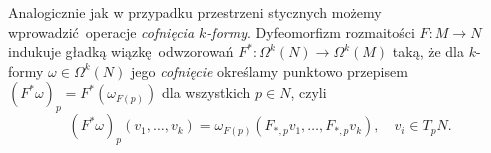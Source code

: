 


Analogicznie jak w przypadku przestrzeni stycznych możemy wprowadzić operacje \emph{cofnięcia \(k\)-formy}. Dyfeomorfizm rozmaitości \(F:M\to N\) indukuje gładką wiązkę odwzorowań \(F^\ast:\Omega^k(N)\to\Omega^{k}(M)\) taką, że dla \(k\)-formy \(\omega\in\Omega^k(N)\) jego \emph{cofnięcie} określamy punktowo przepisem \((F^\ast \omega)_p = F^\ast(\omega_{F(p)})\) dla wszystkich \(p\in N\), czyli
\begin{equation*}
    (F^\ast\omega)_p(v_1, \dots, v_k) = \omega_{F(p)}(F_{\ast,p}v_1, \dots, F_{\ast,p}v_k),\quad v_i\in T_p N.
\end{equation*}

